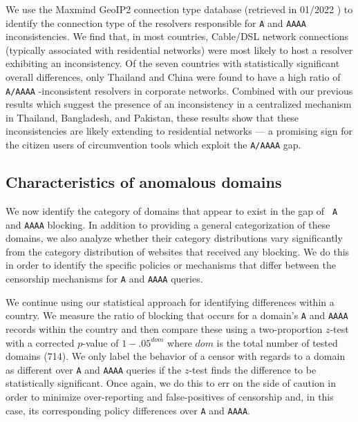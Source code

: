 %
We use the Maxmind GeoIP2 connection type database (retrieved in 01/2022
\cite{maxmind-connectiondb}) to identify the connection type of the resolvers
responsible for {\tt A} and {\tt AAAA} inconsistencies. 
%
We find that, in most countries, Cable/DSL network connections (typically
associated with residential networks) were most likely to host a resolver
exhibiting an inconsistency. 
%
Of the seven countries with statistically significant overall differences, only
Thailand and China were found to have a high ratio of {\tt A/AAAA} -inconsistent
resolvers in corporate networks. 
%
Combined with our previous results which suggest the presence of an
inconsistency in a centralized mechanism in Thailand, Bangladesh, and Pakistan,
these results show that these inconsistencies are likely extending to
residential networks --- a promising sign for the citizen users of
circumvention tools which exploit the {\tt A/AAAA} gap.

\subsection{Characteristics of anomalous domains} 
\label{sec:resources:domains}
We now identify the category of domains that appear to exist in the gap of {\tt
A} and {\tt AAAA} blocking. In addition to providing a general categorization
of these domains, we also analyze whether their category distributions vary
significantly from the category distribution of websites that received any
blocking. We do this in order to identify the specific policies or mechanisms
that differ between the censorship mechanisms for {\tt A} and {\tt AAAA}
queries.

We continue using our statistical approach for identifying differences within
a country. We measure the ratio of blocking that occurs for a domain's {\tt A}
and {\tt AAAA} records within the country and then compare these using
a two-proportion $z$-test with a \Sidak corrected $p$-value of $1-.05^{dom}$
where $dom$ is the total number of tested domains (714). We only label the
behavior of a censor with regards to a domain as different over {\tt A} and
{\tt AAAA} queries if the $z$-test finds the difference to be statistically
significant. Once again, we do this to err on the side of caution in order to
minimize over-reporting and false-positives of censorship and, in this case,
its corresponding policy differences over {\tt A} and {\tt AAAA}.

